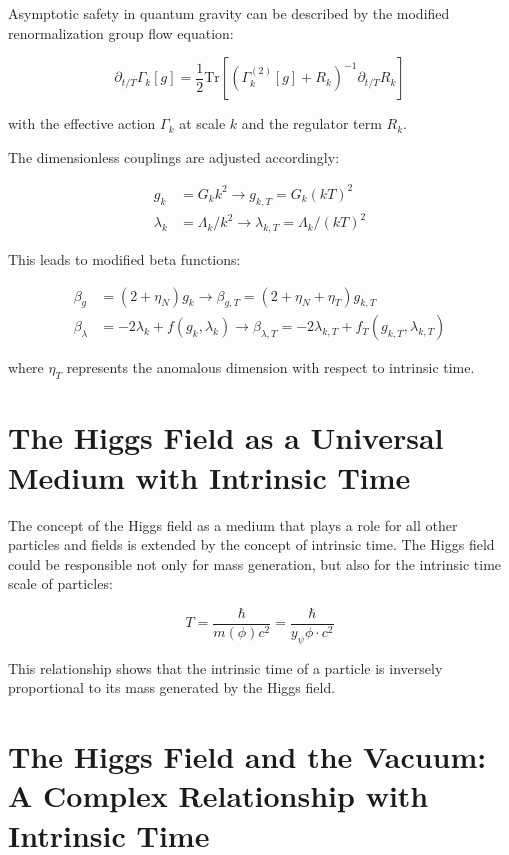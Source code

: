 \documentclass{article}
\begin{document}
	Asymptotic safety in quantum gravity can be described by the modified renormalization group flow equation:
	
	\begin{equation}
		\partial_{t/T} \Gamma_k[g] = \frac{1}{2} \text{Tr}\left[\left(\Gamma_k^{(2)}[g] + R_k\right)^{-1} \partial_{t/T} R_k\right]
	\end{equation}
	
	with the effective action $\Gamma_k$ at scale $k$ and the regulator term $R_k$.
	
	The dimensionless couplings are adjusted accordingly:
	
	\begin{align}
		g_k &= G_k k^2 \rightarrow g_{k,T} = G_k (kT)^2 \\
		\lambda_k &= \Lambda_k/k^2 \rightarrow \lambda_{k,T} = \Lambda_k/(kT)^2
	\end{align}
	
	This leads to modified beta functions:
	
	\begin{align}
		\beta_g &= (2 + \eta_N)g_k \rightarrow \beta_{g,T} = (2 + \eta_N + \eta_T)g_{k,T} \\
		\beta_\lambda &= -2\lambda_k + f(g_k,\lambda_k) \rightarrow \beta_{\lambda,T} = -2\lambda_{k,T} + f_T(g_{k,T},\lambda_{k,T})
	\end{align}
	
	where $\eta_T$ represents the anomalous dimension with respect to intrinsic time.
	
	\section{The Higgs Field as a Universal Medium with Intrinsic Time}
	
	The concept of the Higgs field as a medium that plays a role for all other particles and fields is extended by the concept of intrinsic time.  The Higgs field could be responsible not only for mass generation, but also for the intrinsic time scale of particles:
	
	\begin{equation}
		T = \frac{\hbar}{m(\phi)c^2} = \frac{\hbar}{y_\psi \phi \cdot c^2}
	\end{equation}
	
	This relationship shows that the intrinsic time of a particle is inversely proportional to its mass generated by the Higgs field.
	
	\section{The Higgs Field and the Vacuum: A Complex Relationship with Intrinsic Time}
	
\end{document}
